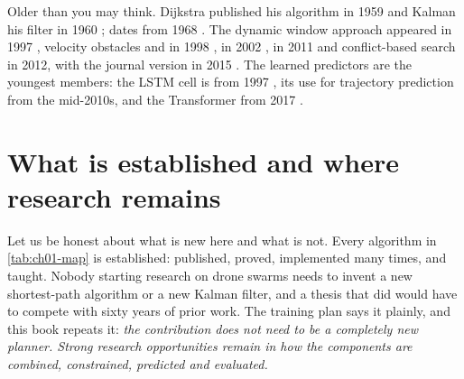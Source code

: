 \begin{historynote}
Older than you may think. Dijkstra published his algorithm in 1959
\cite{dijkstra1959note} and Kalman his filter in 1960 \cite{kalman1960new}; \astar
dates from 1968 \cite{hart1968formal}. The dynamic window approach appeared in 1997
\cite{fox1997dwa}, velocity obstacles and \rrt in 1998
\cite{fiorini1998motion,lavalle1998rrt}, \dstarlite in 2002
\cite{koenig2002dstarlite}, \orca in 2011 \cite{vandenberg2011orca} and conflict-based
search in 2012, with the journal version in 2015 \cite{sharon2015cbs}. The learned
predictors are the youngest members: the LSTM cell is from 1997
\cite{hochreiter1997lstm}, its use for trajectory prediction from the mid-2010s, and
the Transformer from 2017 \cite{vaswani2017attention}.
\end{historynote}

\section{What is established and where research remains}
\label{sec:ch01-research}

Let us be honest about what is new here and what is not. Every algorithm in
\cref{tab:ch01-map} is established: published, proved, implemented many times, and
taught. Nobody starting research on drone swarms needs to invent a new shortest-path
algorithm or a new Kalman filter, and a thesis that did would have to compete with
sixty years of prior work. The training plan says it plainly, and this book repeats
it: \emph{the contribution does not need to be a completely new planner. Strong
research opportunities remain in how the components are combined, constrained,
predicted and evaluated.}

